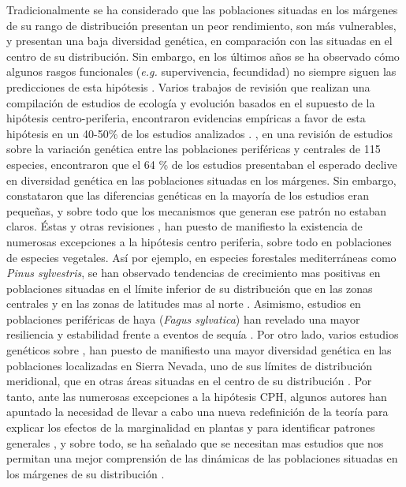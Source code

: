 Tradicionalmente se ha considerado que las poblaciones situadas en los márgenes de su rango de distribución presentan un peor rendimiento, son más vulnerables, y presentan una baja diversidad genética, en comparación con las situadas en el centro de su distribución. Sin embargo, en los últimos años se ha observado cómo algunos rasgos funcionales (\emph{e.g.} supervivencia, fecundidad) no siempre siguen las predicciones de esta hipótesis \autocite{Pirononetal2017GeographicVariation}. Varios trabajos de revisión que realizan una compilación de estudios de ecología y evolución basados en el supuesto de la hipótesis centro-periferia, encontraron evidencias empíricas a favor de esta hipótesis en un 40-50\% de los estudios analizados \autocites{SagarinGaines2002AbundantCentre,Pirononetal2017GeographicVariation}. \citet{Eckertetal2008GeneticVariation}, en una revisión de estudios sobre la variación genética entre las poblaciones periféricas y centrales de 115 especies, encontraron que el 64 \% de los estudios presentaban el esperado declive en diversidad genética en las poblaciones situadas en los márgenes. Sin embargo, constataron que las diferencias genéticas en la mayoría de los estudios eran pequeñas, y sobre todo que los mecanismos que generan ese patrón no estaban claros.  
Éstas y otras revisiones \autocite[\emph{e.g.}][]{Abelietal2014EffectsMarginality}, han puesto de manifiesto la existencia de numerosas excepciones a la hipótesis centro periferia, sobre todo en poblaciones de especies vegetales. Así por ejemplo, en especies forestales mediterráneas como \emph{Pinus sylvestris}, se han observado tendencias de crecimiento mas positivas en poblaciones situadas en el límite inferior de su distribución que en las zonas centrales y en las zonas de latitudes mas al norte \autocite{Matiasetal2017ContrastingGrowth}. Asimismo, estudios en poblaciones periféricas de haya (\emph{Fagus sylvatica}) han revelado una mayor resiliencia y estabilidad frente a eventos de sequía \autocite{VilaCabreraetal2019RefiningPredictions}. Por otro lado, varios estudios genéticos sobre \Qpy, han puesto de manifiesto una mayor diversidad genética en las poblaciones localizadas en Sierra Nevada, uno de sus límites de distribución meridional, que en otras áreas situadas en el centro de su distribución \autocites{ValbuenaCarabanaGil2013GeneticResilience, ValbuenaCarabanaGil2017CentenaryCoppicing}. Por tanto, ante las numerosas excepciones a la hipótesis CPH, algunos autores han apuntado la necesidad de llevar a cabo una nueva redefinición de la teoría para explicar los efectos de la marginalidad en plantas y para identificar patrones generales \autocite[][]{Abelietal2014EffectsMarginality}, y sobre todo, se ha señalado que se necesitan mas estudios que nos permitan una mejor comprensión de las dinámicas de las poblaciones situadas en los márgenes de su distribución \autocites{VilaCabreraetal2019RefiningPredictions,Jumpetal2010MonitoringManaging, HampeJump2011ClimateRelicts, Fadyetal2016EvolutionbasedApproach}. 

